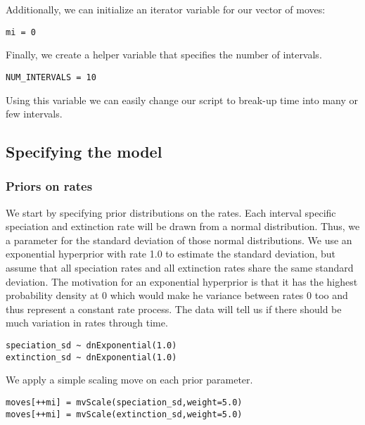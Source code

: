 Additionally, we can initialize an iterator variable for our vector of moves:
{\tt \begin{snugshade*}
\begin{lstlisting}
mi = 0
\end{lstlisting}
\end{snugshade*}}

Finally, we create a helper variable that specifies the number of intervals.
{\tt \begin{snugshade*}
\begin{lstlisting}
NUM_INTERVALS = 10
\end{lstlisting}
\end{snugshade*}}
Using this variable we can easily change our script to break-up time into many or few intervals.



\subsection{Specifying the model}

\subsubsection{Priors on rates}
We start by specifying prior distributions on the rates.
Each interval specific speciation and extinction rate will be drawn from a normal distribution.
Thus, we a parameter for the standard deviation of those normal distributions.
We use an exponential hyperprior with rate 1.0 to estimate the standard deviation, but assume that all speciation rates and all extinction rates share the same standard deviation.
The motivation for an exponential hyperprior is that it has the highest probability density at 0 which would make he variance between rates 0 too and thus represent a constant rate process.
The data will tell us if there should be much variation in rates through time.
{\tt \begin{snugshade*}
\begin{lstlisting}
speciation_sd ~ dnExponential(1.0)
extinction_sd ~ dnExponential(1.0)
\end{lstlisting}
\end{snugshade*}}
We apply a simple scaling move on each prior parameter.
{\tt \begin{snugshade*}
\begin{lstlisting}
moves[++mi] = mvScale(speciation_sd,weight=5.0)
moves[++mi] = mvScale(extinction_sd,weight=5.0)
\end{lstlisting}
\end{snugshade*}}

